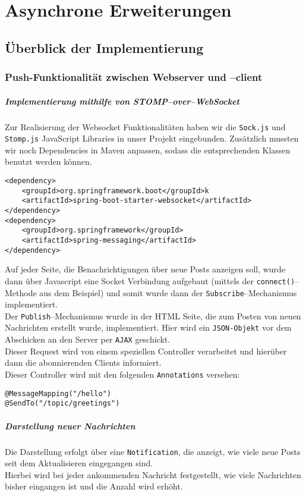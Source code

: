 \chapter{Asynchrone Erweiterungen}
\section{Überblick der Implementierung}
\subsection{Push-Funktionalität zwischen Webserver und --client}
\paragraph{Implementierung mithilfe von STOMP--over--WebSocket}
Zur Realisierung der Websocket Funktionalitäten haben wir die \texttt{Sock.js} und \texttt{Stomp.js} JavaScript Libraries in unser Projekt eingebunden. Zusätzlich mussten wir noch Dependencies in Maven anpassen, sodass die entsprechenden Klassen benutzt werden können.
\begin{verbatim}
<dependency>
    <groupId>org.springframework.boot</groupId>k
    <artifactId>spring-boot-starter-websocket</artifactId>
</dependency>
<dependency>
    <groupId>org.springframework</groupId>
    <artifactId>spring-messaging</artifactId>
</dependency>
\end{verbatim}

Auf jeder Seite, die Benachrichtigungen über neue Posts anzeigen soll, wurde dann über Javascript eine Socket Verbindung aufgebaut (mittels der \texttt{connect()}--Methode aus dem Beispiel) und somit wurde dann der \texttt{Subscribe}--Mechanismus implementiert.\\
Der \texttt{Publish}--Mechanismus wurde in der HTML Seite, die zum Posten von neuen Nachrichten erstellt wurde, implementiert. Hier wird ein \texttt{JSON-Objekt} vor dem Abschicken an den Server per \texttt{AJAX} geschickt. \\ Dieser Request wird von einem speziellen Controller verarbeitet und hierüber dann die abonnierenden Clients informiert. \\
Dieser Controller wird mit den folgenden \texttt{Annotations} versehen:

\begin{verbatim}
@MessageMapping("/hello")
@SendTo("/topic/greetings")
\end{verbatim}

\newpage
\paragraph{Darstellung neuer Nachrichten}
Die Darstellung erfolgt über eine \texttt{Notification}, die anzeigt, wie viele neue Posts seit dem Aktualisieren eingegangen sind. \\
Hierbei wird bei jeder ankommenden Nachricht festgestellt, wie viele Nachrichten bisher eingangen ist und die Anzahl wird erhöht.

